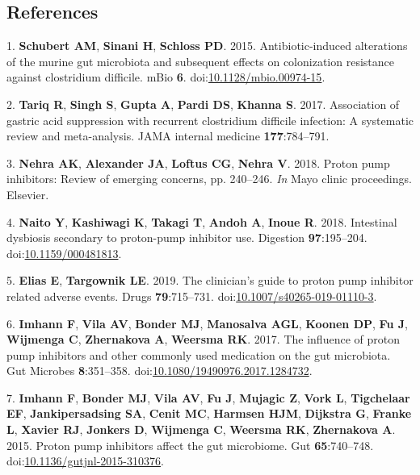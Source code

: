 \documentclass[11pt,]{article}
\begin{document}
\newpage

\subsection{References}\label{references}

\hypertarget{refs}{}
\hypertarget{ref-Schubert2015}{}
1. \textbf{Schubert AM}, \textbf{Sinani H}, \textbf{Schloss PD}. 2015.
Antibiotic-induced alterations of the murine gut microbiota and
subsequent effects on colonization resistance against clostridium
difficile. mBio \textbf{6}.
doi:\href{https://doi.org/10.1128/mbio.00974-15}{10.1128/mbio.00974-15}.

\hypertarget{ref-tariq2017association}{}
2. \textbf{Tariq R}, \textbf{Singh S}, \textbf{Gupta A}, \textbf{Pardi
DS}, \textbf{Khanna S}. 2017. Association of gastric acid suppression
with recurrent clostridium difficile infection: A systematic review and
meta-analysis. JAMA internal medicine \textbf{177}:784--791.

\hypertarget{ref-nehra2018proton}{}
3. \textbf{Nehra AK}, \textbf{Alexander JA}, \textbf{Loftus CG},
\textbf{Nehra V}. 2018. Proton pump inhibitors: Review of emerging
concerns, pp. 240--246. \emph{In} Mayo clinic proceedings. Elsevier.

\hypertarget{ref-Naito2018}{}
4. \textbf{Naito Y}, \textbf{Kashiwagi K}, \textbf{Takagi T},
\textbf{Andoh A}, \textbf{Inoue R}. 2018. Intestinal dysbiosis secondary
to proton-pump inhibitor use. Digestion \textbf{97}:195--204.
doi:\href{https://doi.org/10.1159/000481813}{10.1159/000481813}.

\hypertarget{ref-Elias2019}{}
5. \textbf{Elias E}, \textbf{Targownik LE}. 2019. The clinician's guide
to proton pump inhibitor related adverse events. Drugs
\textbf{79}:715--731.
doi:\href{https://doi.org/10.1007/s40265-019-01110-3}{10.1007/s40265-019-01110-3}.

\hypertarget{ref-Imhann2017}{}
6. \textbf{Imhann F}, \textbf{Vila AV}, \textbf{Bonder MJ},
\textbf{Manosalva AGL}, \textbf{Koonen DP}, \textbf{Fu J},
\textbf{Wijmenga C}, \textbf{Zhernakova A}, \textbf{Weersma RK}. 2017.
The influence of proton pump inhibitors and other commonly used
medication on the gut microbiota. Gut Microbes \textbf{8}:351--358.
doi:\href{https://doi.org/10.1080/19490976.2017.1284732}{10.1080/19490976.2017.1284732}.

\hypertarget{ref-Imhann2015}{}
7. \textbf{Imhann F}, \textbf{Bonder MJ}, \textbf{Vila AV}, \textbf{Fu
J}, \textbf{Mujagic Z}, \textbf{Vork L}, \textbf{Tigchelaar EF},
\textbf{Jankipersadsing SA}, \textbf{Cenit MC}, \textbf{Harmsen HJM},
\textbf{Dijkstra G}, \textbf{Franke L}, \textbf{Xavier RJ},
\textbf{Jonkers D}, \textbf{Wijmenga C}, \textbf{Weersma RK},
\textbf{Zhernakova A}. 2015. Proton pump inhibitors affect the gut
microbiome. Gut \textbf{65}:740--748.
doi:\href{https://doi.org/10.1136/gutjnl-2015-310376}{10.1136/gutjnl-2015-310376}.
\end{document}

